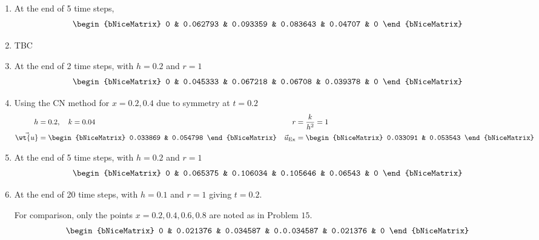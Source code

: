 \begin{enumerate}
    \item At the end of 5 time steps,
          \begin{align}
              \begin{bNiceMatrix}
                  0 & 0.062793 & 0.093359 & 0.083643 & 0.04707 & 0
              \end{bNiceMatrix}
          \end{align}

    \item TBC

    \item At the end of 2 time steps, with $ h = 0.2 $ and $ r = 1 $
          \begin{align}
              \begin{bNiceMatrix}
                  0 & 0.045333 & 0.067218 & 0.06708 & 0.039378 & 0
              \end{bNiceMatrix}
          \end{align}

    \item Using the CN method for $ x = 0.2, 0.4 $ due to symmetry at $t = 0.2$
          \begin{align}
              h                   & = 0.2, \quad k = 0.04 &
              r                   & = \frac{k}{h^2} = 1     \\
              \vec{\wt{u}}        & = \begin{bNiceMatrix}
                                          0.033869 & 0.054798
                                      \end{bNiceMatrix} &
              \vec{u}_{\text{Ex}} & = \begin{bNiceMatrix}
                                          0.033091 & 0.053543
                                      \end{bNiceMatrix}
          \end{align}

    \item At the end of 5 time steps, with $ h = 0.2 $ and $ r = 1 $
          \begin{align}
              \begin{bNiceMatrix}
                  0 & 0.065375 & 0.106034 & 0.105646 & 0.06543 & 0
              \end{bNiceMatrix}
          \end{align}

    \item At the end of 20 time steps, with $ h = 0.1 $ and $ r = 1 $ giving $ t = 0.2 $.
          \par For comparison, only the points $ x = 0.2,0.4,0.6,0.8 $ are noted as in
          Problem $ 15 $.
          \begin{align}
              \begin{bNiceMatrix}
                  0 & 0.021376 & 0.034587 & 0.0.034587 & 0.021376 & 0
              \end{bNiceMatrix}
          \end{align}


\end{enumerate}
